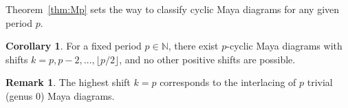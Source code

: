 \documentclass{amsart}
\newtheorem{proposition}{Proposition}
\theoremstyle{definition}
\newtheorem{corollary}{Corollary}
\newtheorem{remark}{Remark}
\newcommand{\N}{\mathbb{N}}
\newcommand{\Z}{\mathbb{Z}}
\newcommand{\bmu}{{\boldsymbol{\mu}}}
\begin{document}
Theorem~\ref{thm:Mp} sets the way to classify cyclic Maya diagrams for
any given period $p$.
\begin{corollary}\label{cor:k}
  For a fixed period $p\in \N$, there exist $p$-cyclic Maya diagrams with
  shifts $k=p,p-2,\dots,\lfloor p/2\rfloor$, and no other positive shifts are  possible.
\end{corollary}

\begin{remark}
  The highest shift $k=p$ corresponds to the interlacing of $p$ trivial (genus
  0) Maya diagrams.
\end{remark}




\end{document}
